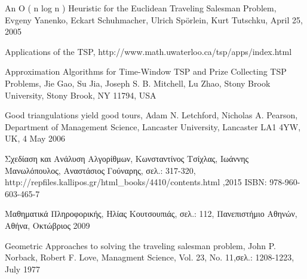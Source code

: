 \documentclass[oneside,12pt]{book}
\theoremstyle{definition}
\begin{document}
\begin{thebibliography}{depth}
	An O ( n log n ) Heuristic for the Euclidean Traveling Salesman Problem, 
	Evgeny Yanenko, Eckart
	Schuhmacher, Ulrich Spörlein, Kurt Tutschku,
	April 25, 2005
	
	Applications of the TSP,
	http://www.math.uwaterloo.ca/tsp/apps/index.html
	
	Approximation Algorithms for Time-Window
	TSP and Prize Collecting TSP Problems,
	Jie Gao, Su Jia, Joseph S. B. Mitchell, Lu Zhao,
	Stony Brook University, Stony Brook, NY 11794, USA
	
	Good triangulations yield good tours,
	Adam N. Letchford, Nicholas A. Pearson,
	Department of Management Science, Lancaster University, Lancaster LA1 4YW, UK, 
	4 May 2006

	Σχεδίαση και Ανάλυση Αλγορίθμων,
	Κωνσταντίνος Τσίχλας, Ιωάννης Μανωλόπουλος, Αναστάσιος Γούναρης,
	σελ.: 317-320,
	http://repfiles.kallipos.gr/html\_books/4410/contents.html ,2015
	ISBN: 978-960-603-465-7
	
	Μαθηματικά Πληροφορικής,
	Ηλίας Κουτσουπιάς,
	σελ.: 112,
	Πανεπιστήμιο Αθηνών, Αθήνα, Οκτώβριος 2009
	
	Geometric Approaches to solving the traveling salesman problem,
	John P. Norback, Robert F. Love,
	Managment Science, Vol. 23, No. 11,σελ.: 1208-1223,
	July 1977
	
\end{thebibliography}
\end{document}
